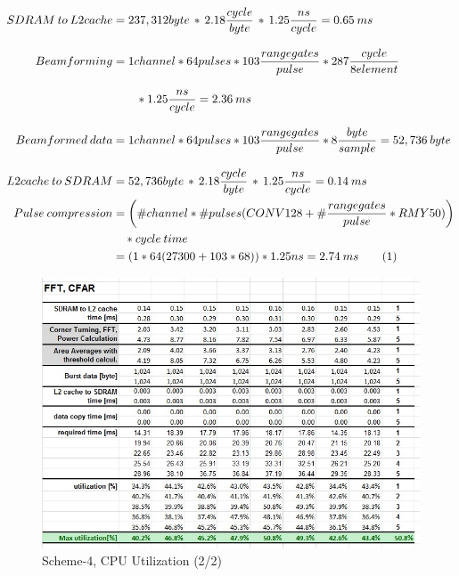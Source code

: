 \begin{align*}
\label{aa:scheme5:equ1}
	SDRAM \: to \: L2cache &= 237,312 byte \, * \, 2.18\frac{cycle}{byte} \, * \, 1.25\frac{ns}{cycle} = 0.65 \: ms \\[0.3cm]
	Beamforming &= 1channel * 64pulses * 103 \frac{range gates}{pulse} * 287\frac{cycle}{8 element} \\[0.3cm] 
	&\qquad * 1.25\frac{ns}{cycle} = 2.36 \: ms\\[0.3cm]
	Beamformed \: data &= 1channel * 64pulses * 103 \frac{range gates}{pulse} *8\frac{byte}{sample} = 52,736 \: byte \\[0.3cm]
	L2cache \: to \: SDRAM &= 52,736 byte \, * \, 2.18\frac{cycle}{byte} \, * \, 1.25\frac{ns}{cycle} = 0.14 \: ms \\
	Pulse \: compression &= \bigg(\#channel * \#pulses (CONV128 +  \# \frac{range gates}{pulse} * RMY50)\bigg) \\
			& \quad * cycle \: time \\
			&= (1 * 64 (27300 + 103 * 68)) * 1.25ns = 2.74 \: ms \stepcounter{equation}\tag{\theequation} 
\end{align*}

\begin{figure}[h!]
	\centering
	\includegraphics[width=160mm]{figures/scheme5_cpu_util2}
	\caption{Scheme-4, CPU Utilization (2/2)}
	\label{fig:mm:scheme5_cpu_util2}
\end{figure}

